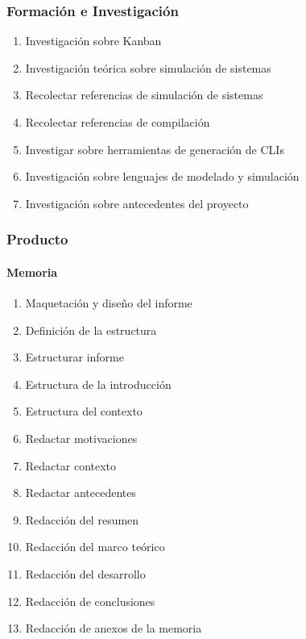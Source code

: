 \subsubsection{Formación e Investigación}
\begin{enumerate}
    \item Investigación sobre Kanban
    \item Investigación teórica sobre simulación de sistemas
    \item Recolectar referencias de simulación de sistemas
    \item Recolectar referencias de compilación
    \item Investigar sobre herramientas de generación de CLIs
    \item Investigación sobre lenguajes de modelado y simulación
    \item Investigación sobre antecedentes del proyecto
\end{enumerate}

\subsubsection{Producto}
\paragraph{Memoria}
\begin{enumerate}
    \item Maquetación y diseño del informe
    \item Definición de la estructura
    \item Estructurar informe
    \item Estructura de la introducción
    \item Estructura del contexto
    \item Redactar motivaciones
    \item Redactar contexto
    \item Redactar antecedentes
    \item Redacción del resumen
    \item Redacción del marco teórico
    \item Redacción del desarrollo
    \item Redacción de conclusiones
    \item Redacción de anexos de la memoria
\end{enumerate}

